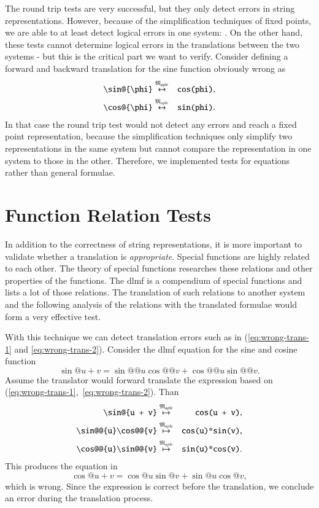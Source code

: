 The round trip tests are very successful, but they only detect errors in string representations. However, because of the simplification techniques of fixed points, we are able to at least detect logical errors in one system: \Maple. On the other hand, these tests cannot determine logical errors in the translations between the two systems - but this is the critical part we want to verify. Consider defining a forward and backward translation for the sine function obviously wrong as
\begin{eqnarray}
\verb|\sin@{\phi}| & \overset{\langMaple}{\leftrightarrow} & \verb|cos(phi)|,\label{eq:wrong-trans-1}\\
\verb|\cos@{\phi}| & \overset{\langMaple}{\leftrightarrow} & \verb|sin(phi)|.\label{eq:wrong-trans-2}
\end{eqnarray}
In that case the round trip test would not detect any errors and reach a fixed point representation, because the simplification techniques only simplify two representations in the same system but cannot compare the representation in one system to those in the other. Therefore, we implemented tests for equations rather than general formulae.

\section{Function Relation Tests}\label{sec:relation-tests}
In addition to the correctness of string representations, it is more important to validate whether a translation is \textit{appropriate}. Special functions are highly related to each other. The theory of special functions researches these relations and other properties of the functions. The \gls{dlmf} is a compendium of special functions and lists a lot of those relations. The translation of such relations to another system and the following analysis of the relations with the translated formulae would form a very effective test.

With this technique we can detect translation errors such as in (\ref{eq:wrong-trans-1} and \ref{eq:wrong-trans-2}). Consider the \gls{dlmf} equation for the sine and cosine function~\cite[(4.21.2)]{NIST:DLMF}
\begin{equation}
\sin@{u+v} = \sin@@{u}\cos@@{v} + \cos@@{u}\sin@@{v}.
\end{equation}
Assume the translator would forward translate the expression based on (\ref{eq:wrong-trans-1},~\ref{eq:wrong-trans-2}). Than
\begin{eqnarray}
\verb|\sin@{u + v}| & \overset{\langMaple}{\mapsto} & \verb|cos(u + v)|,\\
\verb|\sin@@{u}\cos@@{v}| & \overset{\langMaple}{\mapsto} & \verb|cos(u)*sin(v)|,\\
\verb|\cos@@{u}\sin@@{v}| & \overset{\langMaple}{\mapsto} & \verb|sin(u)*cos(v)|.
\end{eqnarray}
This produces the equation in \Maple
\begin{equation}
\cos@{u+v} = \cos@{u}\sin@{v} + \sin@{u}\cos@{v},
\end{equation}
which is wrong. Since the expression is correct before the translation, we conclude an error during the translation process.

